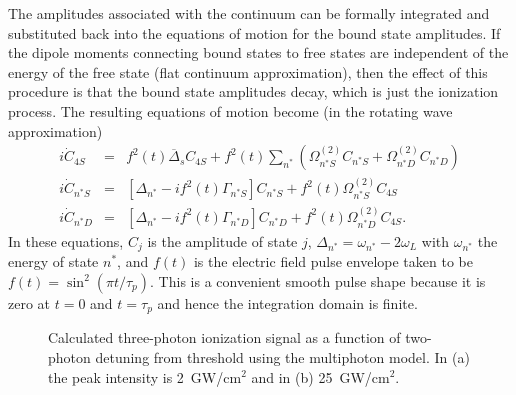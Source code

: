 The amplitudes associated with the continuum can be formally integrated and
substituted back into the equations of motion for the bound state amplitudes. 
If the dipole moments connecting bound states to free states are independent
of the energy of the free state (flat continuum approximation), then the effect
of this procedure is that the bound state amplitudes decay, which is just the
ionization process.  The resulting equations of motion become (in the rotating
wave approximation)
\begin{eqnarray}
i\dot{C}_{4S}& = &f^2(t)\overline{\Delta}_s C_{4S} +
f^2(t)\sum_{n^*}\left(\Omega^{(2)}_{n^*S}C_{n^*S} +
\Omega^{(2)}_{n^*D}C_{n^*D}\right) \\
i\dot{C}_{n^*S}& = & \left[\Delta_{n^*}-if^2(t)\Gamma_{n^*S}\right] C_{n^*S} +
f^2(t)\Omega^{(2)}_{n^*S} C_{4S} \\
i\dot{C}_{n^*D}& = & \left[\Delta_{n^*}-if^2(t)\Gamma_{n^*D}\right] C_{n^*D} +
f^2(t)\Omega^{(2)}_{n^*D} C_{4S}.
\end{eqnarray}
In these equations, $C_{j}$ is the amplitude of state $j$, $\Delta_{n^*} =
\omega_{n^*} - 2\omega_L$ with $\omega_{n^*}$ the energy of state $n^*$, and
$f(t)$ is the electric field pulse envelope taken to be $f(t) = \sin^2(\pi
t/\tau_p)$.  This is a convenient smooth pulse shape because it is zero at
$t=0$ and $t=\tau_p$ and hence the integration domain is finite.

\begin{figure}[tbp]
\bigskip
{}
{Calculated three-photon ionization signal as a function of two-photon detuning
from threshold using the multiphoton model.  In (a) the peak intensity is
2~GW/cm$^2$ and in (b) 25~GW/cm$^{2}$.
\label{mix_thy1}}
\end{figure}


